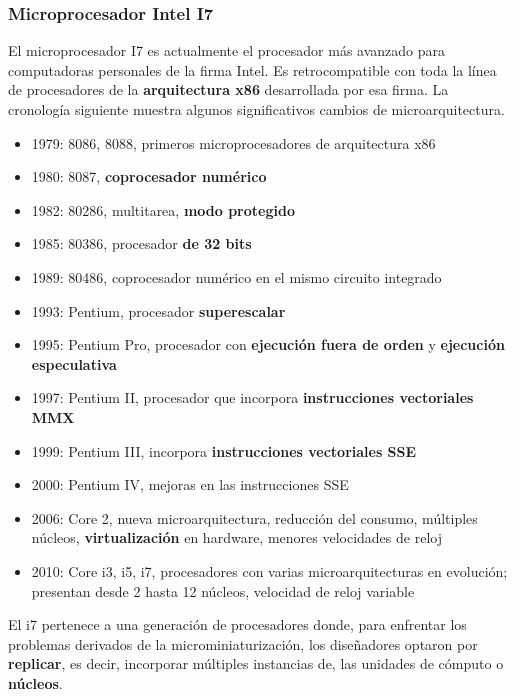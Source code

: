 \documentclass[spanish,A4,]{article}
\begin{document}
\subsubsection{Microprocesador Intel I7}\label{microprocesador-intel-i7}

El microprocesador I7 es actualmente el procesador más avanzado para
computadoras personales de la firma Intel. Es retrocompatible con toda
la línea de procesadores de la \textbf{arquitectura x86} desarrollada
por esa firma. La cronología siguiente muestra algunos significativos
cambios de microarquitectura.

\begin{itemize}
\itemsep1pt\parskip0pt
\item
  1979: 8086, 8088, primeros microprocesadores de arquitectura x86
\item
  1980: 8087, \textbf{coprocesador numérico}
\item
  1982: 80286, multitarea, \textbf{modo protegido}
\item
  1985: 80386, procesador \textbf{de 32 bits}
\item
  1989: 80486, coprocesador numérico en el mismo circuito integrado
\item
  1993: Pentium, procesador \textbf{superescalar}
\item
  1995: Pentium Pro, procesador con \textbf{ejecución fuera de orden} y
  \textbf{ejecución especulativa}
\item
  1997: Pentium II, procesador que incorpora \textbf{instrucciones
  vectoriales MMX}
\item
  1999: Pentium III, incorpora \textbf{instrucciones vectoriales SSE}
\item
  2000: Pentium IV, mejoras en las instrucciones SSE
\item
  2006: Core 2, nueva microarquitectura, reducción del consumo,
  múltiples núcleos, \textbf{virtualización} en hardware, menores
  velocidades de reloj
\item
  2010: Core i3, i5, i7, procesadores con varias microarquitecturas en
  evolución; presentan desde 2 hasta 12 núcleos, velocidad de reloj
  variable
\end{itemize}

El i7 pertenece a una generación de procesadores donde, para enfrentar
los problemas derivados de la microminiaturización, los diseñadores
optaron por \textbf{replicar}, es decir, incorporar múltiples instancias
de, las unidades de cómputo o \textbf{núcleos}.
\end{document}
